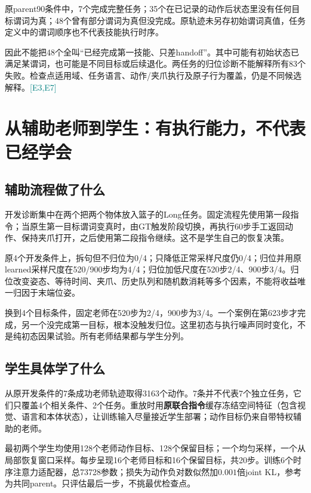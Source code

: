 \documentclass[UTF8,a4paper,fontset=none,zihao=-4]{ctexart}
\newcommand{\ev}[1]{\textcolor{teal}{\small[#1]}}
\begin{document}
原parent90条件中，7个完成完整任务；35个在已记录的动作后状态里没有任何目标谓词为真；48个曾有部分谓词为真但没完成。原轨迹未另存初始谓词真值，任务定义中的谓词顺序也不代表技能执行时序。

因此不能把48个全叫“已经完成第一技能、只差handoff”。其中可能有初始状态已满足某谓词，也可能是不同目标或后续退化。两任务的归位诊断不能解释所有83个失败。检查点适用域、任务语言、动作/夹爪执行及原子行为覆盖，仍是不同候选解释。\ev{E3,E7}
\section{从辅助老师到学生：有执行能力，不代表已经学会}
\subsection{辅助流程做了什么}
开发诊断集中在两个把两个物体放入篮子的Long任务。固定流程先使用第一段指令；当原生第一目标谓词变真时，由GT触发阶段切换，再执行60步手工返回动作、保持夹爪打开，之后使用第二段指令继续。这不是学生自己的恢复决策。

原4个开发条件上，拆句但不归位为0/4；只降低正常采样尺度仍0/4；归位并用原learned采样尺度在520/900步均为4/4；归位加低尺度在520步2/4、900步3/4。归位改变姿态、等待时间、夹爪、历史队列和随机数消耗等多个因素，不能将收益唯一归因于末端位姿。

换到4个目标条件，固定老师在520步为2/4，900步为3/4。一个案例在第623步才完成，另一个没完成第一目标，根本没触发归位。这里初态与执行噪声同时变化，不是纯初态因果试验。所有老师结果都与学生分列。
\subsection{学生具体学了什么}
从原开发条件的7条成功老师轨迹取得3163个动作。7条并不代表7个独立任务，它们只覆盖4个相关条件、2个任务。重放时用\textbf{原联合指令}缓存冻结空间特征（包含视觉、语言和本体状态），让训练输入尽量接近学生部署；动作目标仍来自带特权辅助的老师。

最初两个学生均使用128个老师动作目标、128个保留目标；一个均匀采样，一个从局部恢复窗口采样。每步呈现16个老师目标和16个保留目标，共20步。训练6个时序注意力适配器，总73728参数；损失为动作负对数似然加$0.001$倍joint KL，参考为共同parent。只评估最后一步，不挑最优检查点。
\end{document}
